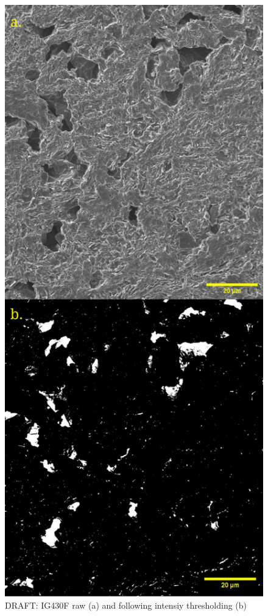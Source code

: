 \documentclass[review]{elsarticle}
\begin{document}
\begin{figure}[!htbp]
    \centering
    \includegraphics[width=0.9\columnwidth]{./Media/intensitythresholdexampleig430fdual.png}
    \caption{DRAFT: IG430F raw (a) and following intensiy thresholding (b)}
    \label{fig:dualintensitythreshig430f}
\end{figure}
\end{document}
